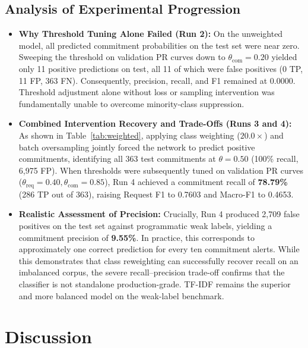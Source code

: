 \documentclass[conference]{IEEEtran}
\begin{document}
\subsection{Analysis of Experimental Progression}
\begin{itemize}
    \item \textbf{Why Threshold Tuning Alone Failed (Run 2):} On the unweighted model, all predicted commitment probabilities on the test set were near zero. Sweeping the threshold on validation PR curves down to $\theta_{\text{com}} = 0.20$ yielded only 11 positive predictions on test, all 11 of which were false positives (0 TP, 11 FP, 363 FN). Consequently, precision, recall, and F1 remained at 0.0000. Threshold adjustment alone without loss or sampling intervention was fundamentally unable to overcome minority-class suppression.
    \item \textbf{Combined Intervention Recovery and Trade-Offs (Runs 3 and 4):} As shown in Table~\ref{tab:weighted}, applying class weighting ($20.0\times$) and batch oversampling jointly forced the network to predict positive commitments, identifying all 363 test commitments at $\theta=0.50$ (100\% recall, 6,975 FP). When thresholds were subsequently tuned on validation PR curves ($\theta_{\text{req}}=0.40, \theta_{\text{com}}=0.85$), Run 4 achieved a commitment recall of \textbf{78.79\%} (286 TP out of 363), raising Request F1 to 0.7603 and Macro-F1 to 0.4653.
    \item \textbf{Realistic Assessment of Precision:} Crucially, Run 4 produced 2,709 false positives on the test set against programmatic weak labels, yielding a commitment precision of \textbf{9.55\%}. In practice, this corresponds to approximately one correct prediction for every ten commitment alerts. While this demonstrates that class reweighting can successfully recover recall on an imbalanced corpus, the severe recall--precision trade-off confirms that the classifier is not standalone production-grade. TF-IDF remains the superior and more balanced model on the weak-label benchmark.
\end{itemize}

\section{Discussion}
\end{document}
